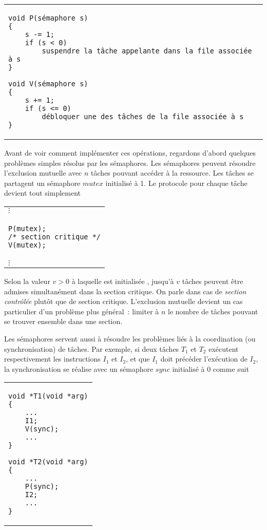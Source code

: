 \begin{center}
\begin{tabular}{l}
\begin{lstlisting}
void P(sémaphore s)
{
	s -= 1;
	if (s < 0)
		suspendre la tâche appelante dans la file associée à s
}

void V(sémaphore s)
{
	s += 1;
	if (s <= 0)
		débloquer une des tâches de la file associée à s
}
\end{lstlisting}
\end{tabular}
\end{center}
\par
Avant de voir comment implémenter ces opérations, regardons d'abord quelques problèmes simples résolus par les sémaphores.
Les sémaphores peuvent résoudre l'exclusion mutuelle avec $n$ tâches pouvant accéder à la ressource.
Les tâches se partagent un sémaphore $mutex$ initialisé à 1.  Le protocole pour chaque tâche devient tout simplement
\begin{center}
\begin{tabular}{l}
\hspace{0.6 cm}$\vdots$ \\
\begin{lstlisting}
P(mutex);
/* section critique */
V(mutex);
\end{lstlisting} \\
\hspace{0.6 cm}$\vdots$
\end{tabular}
\end{center}
\par
Selon la valeur $v>0$ à laquelle est initialisée , jusqu'à $v$ tâches peuvent être admises simultanément dans la section critique.  On parle dans cas de {\em section contrôlée} plutôt que de section critique.  L'exclusion mutuelle devient un cas particulier d'un problème plus général~:  limiter à $n$ le nombre de tâches pouvant se trouver ensemble dans une section.

Les sémaphores servent aussi à résoudre les problèmes liés à la coordination (ou synchronisation) de tâches.  Par exemple, si deux tâches $T_1$ et $T_2$ exécutent respectivement les instructions $I_1$ et $I_2$, et que $I_1$ doit précéder l'exécution de $I_2$, la synchronisation se réalise avec un sémaphore $sync$ initialisé à 0 comme
suit
\begin{center}
\begin{tabular}{l}
\begin{lstlisting}
void *T1(void *arg)
{
	...
	I1;
	V(sync);
	...
}
\end{lstlisting}
\hspace{1 cm}
\begin{lstlisting}
void *T2(void *arg)
{
	...
	P(sync);
	I2;
	...
}
\end{lstlisting}
\end{tabular}
\end{center}

